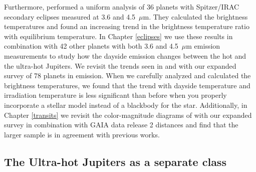 Furthermore, \citet{Garhart2020} performed a uniform analysis of 36 planets with Spitzer/IRAC secondary eclipses measured at 3.6 and 4.5~$\mu$m. They calculated the brightness temperatures and found an increasing trend in the brightness temperature ratio with equilibrium temperature. In Chapter \ref{eclipses} we use these results in combination with 42 other planets with both 3.6 and 4.5~$\mu$m emission measurements to study how the dayside emission changes between the hot and the ultra-hot Jupiters. We revisit the trends seen in \citet{Schwartz2015} and \citet{Garhart2020} with our expanded survey of 78 planets in emission. When we carefully analyzed and calculated  the brightness temperatures, we found that the trend with dayside temperature and irradiation temperature is less significant than before when you properly incorporate a stellar model instead of a blackbody for the star.
Additionally, in Chapter \ref{transits} we revisit the color-magnitude diagrams of \citet{Triaud2014} with our expanded survey in combination with GAIA data release 2 distances and find that the larger sample is in agreement with previous works.

\subsection{The Ultra-hot Jupiters as a separate class}


